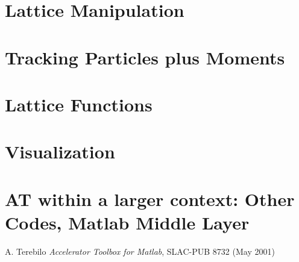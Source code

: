 \documentclass[acus]{article}
\begin{document}
\section{Lattice Manipulation}

\section{Tracking Particles plus Moments}

\section{Lattice Functions}

\section{Visualization}

\section{AT within a larger context: Other Codes, Matlab Middle Layer}

\begin{thebibliography}{2}

A. Terebilo \emph{Accelerator Toolbox for Matlab}, SLAC-PUB 8732 (May 2001)

\end{thebibliography}
\end{document}
